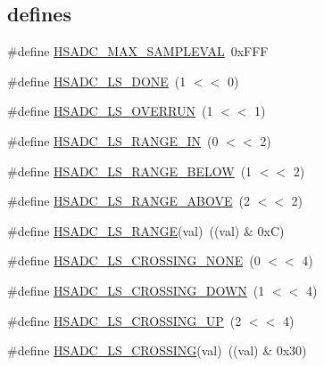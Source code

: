 \subsection*{\textquotesingle{}defines\textquotesingle{}}
\begin{DoxyCompactItemize}
\item 
\#define \hyperlink{group___h_s_a_d_c__18_x_x__43_x_x_ga125fd0f116ea9e450347efe49ecc9673}{H\+S\+A\+D\+C\+\_\+\+M\+A\+X\+\_\+\+S\+A\+M\+P\+L\+E\+V\+AL}~0x\+F\+FF
\item 
\#define \hyperlink{group___h_s_a_d_c__18_x_x__43_x_x_ga3e9186020c5e406feed470a1808363f3}{H\+S\+A\+D\+C\+\_\+\+L\+S\+\_\+\+D\+O\+NE}~(1 $<$$<$ 0)
\item 
\#define \hyperlink{group___h_s_a_d_c__18_x_x__43_x_x_ga5c0a9c9126e736e08a7bb6330a8da5da}{H\+S\+A\+D\+C\+\_\+\+L\+S\+\_\+\+O\+V\+E\+R\+R\+UN}~(1 $<$$<$ 1)
\item 
\#define \hyperlink{group___h_s_a_d_c__18_x_x__43_x_x_gabf5cce50eca68e4c98b7d7d878e34ce8}{H\+S\+A\+D\+C\+\_\+\+L\+S\+\_\+\+R\+A\+N\+G\+E\+\_\+\+IN}~(0 $<$$<$ 2)
\item 
\#define \hyperlink{group___h_s_a_d_c__18_x_x__43_x_x_ga0d03219d2f21b7082c71e737f9291238}{H\+S\+A\+D\+C\+\_\+\+L\+S\+\_\+\+R\+A\+N\+G\+E\+\_\+\+B\+E\+L\+OW}~(1 $<$$<$ 2)
\item 
\#define \hyperlink{group___h_s_a_d_c__18_x_x__43_x_x_ga2ff163a7e694c903c3ea800b69ff357f}{H\+S\+A\+D\+C\+\_\+\+L\+S\+\_\+\+R\+A\+N\+G\+E\+\_\+\+A\+B\+O\+VE}~(2 $<$$<$ 2)
\item 
\#define \hyperlink{group___h_s_a_d_c__18_x_x__43_x_x_gab8577fad41f87c7822073b4b0e1b40c3}{H\+S\+A\+D\+C\+\_\+\+L\+S\+\_\+\+R\+A\+N\+GE}(val)~((val) \& 0x\+C)
\item 
\#define \hyperlink{group___h_s_a_d_c__18_x_x__43_x_x_ga232e739e7c2601b9c0e3cdaede3ff83e}{H\+S\+A\+D\+C\+\_\+\+L\+S\+\_\+\+C\+R\+O\+S\+S\+I\+N\+G\+\_\+\+N\+O\+NE}~(0 $<$$<$ 4)
\item 
\#define \hyperlink{group___h_s_a_d_c__18_x_x__43_x_x_ga5256afbf3a733f1e1598086bcae21313}{H\+S\+A\+D\+C\+\_\+\+L\+S\+\_\+\+C\+R\+O\+S\+S\+I\+N\+G\+\_\+\+D\+O\+WN}~(1 $<$$<$ 4)
\item 
\#define \hyperlink{group___h_s_a_d_c__18_x_x__43_x_x_ga61403d754e6e74e765939cbcdf668458}{H\+S\+A\+D\+C\+\_\+\+L\+S\+\_\+\+C\+R\+O\+S\+S\+I\+N\+G\+\_\+\+UP}~(2 $<$$<$ 4)
\item 
\#define \hyperlink{group___h_s_a_d_c__18_x_x__43_x_x_gabe3b261486872f47b15142374e8ba513}{H\+S\+A\+D\+C\+\_\+\+L\+S\+\_\+\+C\+R\+O\+S\+S\+I\+NG}(val)~((val) \& 0x30)

\end{DoxyCompactItemize}
